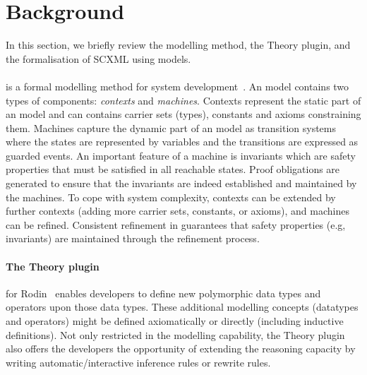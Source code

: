 \section{Background}
\label{sec:background}

In this section, we briefly review the \EventB modelling method, the Theory plugin, and the formalisation of SCXML using \EventB models.

\paragraph{\EventB} is a formal modelling method for system development~\cite{abrial10}. An \EventB model contains two types of components: \emph{contexts} and \emph{machines}.  Contexts represent the static part of an \EventB model and can contains carrier sets (types), constants and axioms constraining them. Machines capture the dynamic part of an \EventB model as transition systems where the states are represented by variables and the transitions are expressed as guarded events. An important feature of a machine is invariants which are safety properties that must be satisfied in all reachable states. Proof obligations are generated to ensure that the invariants are indeed established and maintained by the \EventB machines. To cope with system complexity, contexts can be extended by further contexts (adding more carrier sets, constants, or axioms), and machines can be refined. Consistent refinement in \EventB guarantees that safety properties (e.g, invariants) are maintained through the refinement process.

\paragraph{The Theory plugin}
 for Rodin~\cite{DBLP:conf/birthday/ButlerM13} enables developers to define new polymorphic data types and operators upon those data types. These additional modelling concepts (datatypes and operators) might be defined axiomatically or directly (including inductive definitions). Not only restricted in the modelling capability, the Theory plugin also offers the developers the opportunity of extending the reasoning capacity by writing automatic/interactive inference rules or rewrite rules.

